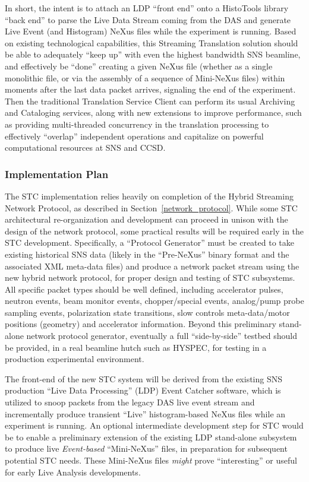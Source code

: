 In short, the intent is to attach an LDP ``front end'' onto a HistoTools
library ``back end'' to parse the Live Data Stream coming from the DAS and
generate Live Event (and Histogram) NeXus files while the experiment is
running. Based on existing technological capabilities, this Streaming
Translation solution should be able to adequately ``keep up'' with even the
highest bandwidth SNS beamline, and effectively be ``done'' creating a given
NeXus file (whether as a single monolithic file, or via the assembly of a
sequence of Mini-NeXus files) within moments after the last data packet
arrives, signaling the end of the experiment. Then the traditional Translation
Service Client can perform its usual Archiving and Cataloging services, along
with new extensions to improve performance, such as providing multi-threaded
concurrency in the translation processing to effectively ``overlap'' independent
operations and capitalize on powerful computational resources at SNS and
CCSD.

\subsubsection{Implementation Plan}

The STC implementation relies heavily on completion of the
Hybrid Streaming Network Protocol,
as described in Section~\ref{network_protocol}.
While some STC architectural re-organization and development can proceed
in unison with the design of the network protocol,
some practical results will be required early in the STC development.
Specifically, a ``Protocol Generator'' must be created to take existing
historical SNS data (likely in the ``Pre-NeXus'' binary format and the
associated XML meta-data files) and produce a network packet stream
using the new hybrid network protocol,
for proper design and testing of STC subsystems.
All specific packet types should be well defined,
including accelerator pulses, neutron events, beam monitor events,
chopper/special events, analog/pump probe sampling events,
polarization state transitions, slow controls meta-data/motor positions
(geometry) and accelerator information.
Beyond this preliminary stand-alone network protocol generator,
eventually a full ``side-by-side'' testbed should be provided,
in a real beamline hutch such as HYSPEC,
for testing in a production experimental environment.

The front-end of the new STC system will be derived from the
existing SNS production ``Live Data Processing'' (LDP)
Event Catcher software,
which is utilized to snoop packets from the legacy DAS live event stream
and incrementally produce transient ``Live'' histogram-based NeXus files
while an experiment is running.
An optional intermediate development step for STC would be to enable a
preliminary extension of the existing LDP stand-alone subsystem to produce
live {\em Event-based} ``Mini-NeXus'' files,
in preparation for subsequent potential STC needs.
These Mini-NeXus files {\em might} prove ``interesting'' or useful
for early Live Analysis developments.


